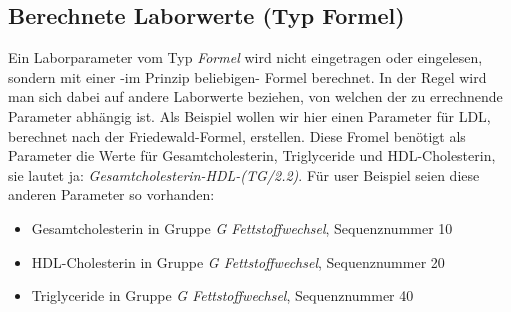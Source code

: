 \subsection{Berechnete Laborwerte (Typ Formel)}
\label{ref:formel}
Ein Laborparameter vom Typ \textit{Formel} wird nicht eingetragen oder eingelesen, sondern mit einer -im Prinzip beliebigen- Formel berechnet. In der Regel wird man sich dabei auf andere Laborwerte beziehen, von welchen der zu errechnende Parameter abhängig ist. Als Beispiel wollen wir hier einen Parameter für LDL, berechnet nach der Friedewald-Formel, erstellen. Diese Fromel benötigt als Parameter die Werte für Gesamtcholesterin, Triglyceride und HDL-Cholesterin, sie lautet ja: \textit{Gesamtcholesterin-HDL-(TG/2.2)}. Für user Beispiel seien diese anderen Parameter so vorhanden:
\begin{itemize}
  \item Gesamtcholesterin in Gruppe \textit{G Fettstoffwechsel}, Sequenznummer 10
  \item HDL-Cholesterin in Gruppe \textit{G Fettstoffwechsel}, Sequenznummer 20
  \item Triglyceride in Gruppe \textit{G Fettstoffwechsel}, Sequenznummer 40
\end{itemize}

